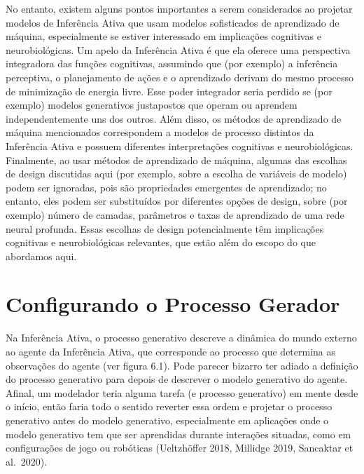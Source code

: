 \documentclass[
  12pt,
]{book}
\begin{document}
No entanto, existem alguns pontos importantes a serem considerados ao projetar modelos de Inferência Ativa que usam modelos sofisticados de aprendizado de máquina, especialmente se estiver interessado em implicações cognitivas e neurobiológicas. Um apelo da Inferência Ativa é que ela oferece uma perspectiva integradora das funções cognitivas, assumindo que (por exemplo) a inferência perceptiva, o planejamento de ações e o aprendizado derivam do mesmo processo de minimização de energia livre. Esse poder integrador seria perdido se (por exemplo) modelos generativos justapostos que operam ou aprendem independentemente uns dos outros. Além disso, os métodos de aprendizado de máquina mencionados correspondem a modelos de processo distintos da Inferência Ativa e possuem diferentes interpretações cognitivas e neurobiológicas. Finalmente, ao usar métodos de aprendizado de máquina, algumas das escolhas de design discutidas aqui (por exemplo, sobre a escolha de variáveis \hspace{0pt}\hspace{0pt}de modelo) podem ser ignoradas, pois são propriedades emergentes de aprendizado; no entanto, eles podem ser substituídos por diferentes opções de design, sobre (por exemplo) número de camadas, parâmetros e taxas de aprendizado de uma rede neural profunda. Essas escolhas de design potencialmente têm implicações cognitivas e neurobiológicas relevantes, que estão além do escopo do que abordamos aqui.

\hypertarget{configurando-o-processo-gerador}{%
\section{Configurando o Processo Gerador}\label{configurando-o-processo-gerador}}

Na Inferência Ativa, o processo generativo descreve a dinâmica do mundo externo ao agente da Inferência Ativa, que corresponde ao processo que determina as observações do agente (ver figura 6.1). Pode parecer bizarro ter adiado a definição do processo generativo para depois de descrever o modelo generativo do agente. Afinal, um modelador teria alguma tarefa (e processo generativo) em mente desde o início, então faria todo o sentido reverter essa ordem e projetar o processo generativo antes do modelo generativo, especialmente em aplicações onde o modelo generativo tem que ser aprendidas durante interações situadas, como em configurações de jogo ou robóticas (Ueltzhöffer 2018, Millidge 2019, Sancaktar et al.~2020).
\end{document}
